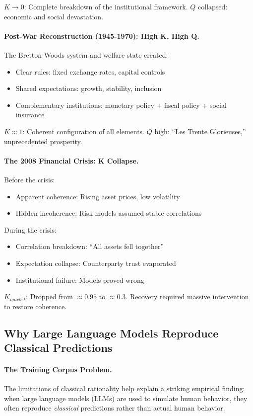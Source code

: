 $K \to 0$: Complete breakdown of the institutional framework.
$Q$ collapsed: economic and social devastation.

\paragraph{Post-War Reconstruction (1945-1970): High K, High Q.}
The Bretton Woods system and welfare state created:
\begin{itemize}
  \item Clear rules: fixed exchange rates, capital controls
  \item Shared expectations: growth, stability, inclusion
  \item Complementary institutions: monetary policy + fiscal policy + social insurance
\end{itemize}

$K \approx 1$: Coherent configuration of all elements.
$Q$ high: ``Les Trente Glorieuses,'' unprecedented prosperity.

\paragraph{The 2008 Financial Crisis: K Collapse.}
Before the crisis:
\begin{itemize}
  \item Apparent coherence: Rising asset prices, low volatility
  \item Hidden incoherence: Risk models assumed stable correlations
\end{itemize}

During the crisis:
\begin{itemize}
  \item Correlation breakdown: ``All assets fell together''
  \item Expectation collapse: Counterparty trust evaporated
  \item Institutional failure: Models proved wrong
\end{itemize}

$K_{market}$: Dropped from $\approx 0.95$ to $\approx 0.3$.
Recovery required massive intervention to restore coherence.

\subsection{Why Large Language Models Reproduce Classical Predictions}

\paragraph{The Training Corpus Problem.}
The limitations of classical rationality help explain a striking empirical finding:
when large language models (LLMs) are used to simulate human behavior, they often
reproduce \emph{classical} predictions rather than actual human behavior.

